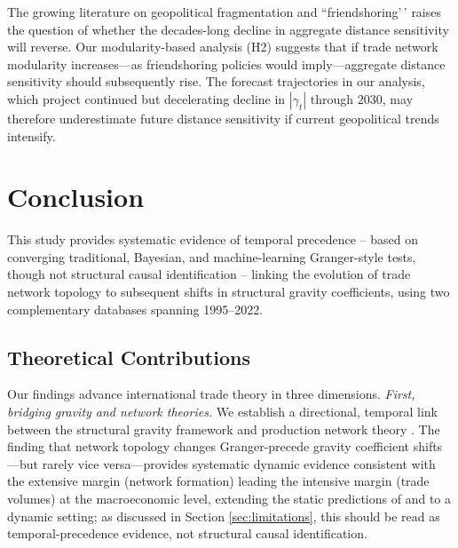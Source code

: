\documentclass[preprint, 3p,
authoryear]{elsarticle} %
\begin{document}
The growing literature on geopolitical fragmentation and
``friendshoring'\,' \citep{alfaro2023reallocation} raises the question
of whether the decades-long decline in aggregate distance sensitivity
will reverse. Our modularity-based analysis (H2) suggests that if trade
network modularity increases---as friendshoring policies would
imply---aggregate distance sensitivity should subsequently rise. The
forecast trajectories in our analysis, which project continued but
decelerating decline in \(|\gamma_t|\) through 2030, may therefore
underestimate future distance sensitivity if current geopolitical trends
intensify.

\section{Conclusion}\label{sec:conclusion}

This study provides systematic evidence of temporal precedence -- based
on converging traditional, Bayesian, and machine-learning Granger-style
tests, though not structural causal identification -- linking the
evolution of trade network topology to subsequent shifts in structural
gravity coefficients, using two complementary databases spanning
1995--2022.

\subsection{Theoretical
Contributions}\label{subsec:theory_contributions}

Our findings advance international trade theory in three dimensions.
\textit{First, bridging gravity and network theories.} We establish a
directional, temporal link between the structural gravity framework
\citep{anderson2003, yotov2024evolution} and production network theory
\citep{acemoglu2012, chaney2014}. The finding that network topology
changes Granger-precede gravity coefficient shifts---but rarely vice
versa---provides systematic dynamic evidence consistent with the
extensive margin (network formation) leading the intensive margin (trade
volumes) at the macroeconomic level, extending the static predictions of
\citet{melitz2015new} and \citet{helpman2008} to a dynamic setting; as
discussed in Section \ref{sec:limitations}, this should be read as
temporal-precedence evidence, not structural causal identification.
\end{document}
